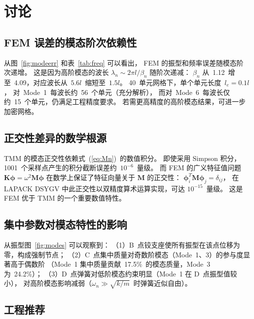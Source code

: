 \documentclass[twoside,12pt]{ctexart}
\newcommand{\betan}{\beta_n}
\begin{document}
\section{讨论}

\subsection{FEM 误差的模态阶次依赖性}

从图~\ref{fig:modeerr} 和表~\ref{tab:freq} 可以看出，
FEM 的振型和频率误差随模态阶次递增。
这是因为高阶模态的波长 $\lambda_n\sim 2\pi l/\betan$ 随阶次递减：
$\betan$ 从~1.12~增至~4.09，对应波长从~$5.6l$~缩短至~$1.5l$。
40~单元网格下，单个单元长度~$l_e=0.1l$，
对~Mode~1~每波长约~56~个单元（充分解析），
而对~Mode~6~每波长仅约~15~个单元，仍满足工程精度要求。
若需更高精度的高阶模态结果，可进一步加密网格。

\subsection{正交性差异的数学根源}

TMM 的模态正交性依赖式~(\ref{eq:Mn})~的数值积分。
即使采用 Simpson 积分，1001~个采样点产生的积分截断误差约~$10^{-6}$~量级。
而 FEM 的广义特征值问题 $\mathbf{K}\bm{\phi}=\omega^2\mathbf{M}\bm{\phi}$
在数学上保证了特征向量关于 $\mathbf{M}$ 的正交性：
$\bm{\phi}_i^T\mathbf{M}\bm{\phi}_j=\delta_{ij}$，
在 LAPACK DSYGV 中此正交性以双精度算术运算实现，可达 $10^{-15}$~量级。
这是 FEM 优于 TMM 的一个重要数值特性。

\subsection{集中参数对模态特性的影响}

从振型图~\ref{fig:modes} 可以观察到：
（1）B~点铰支座使所有振型在该点位移为零，构成强制节点；
（2）C~点集中质量对奇数阶模态（Mode~1、3）的参与度显著高于偶数阶
（Mode~1 集中质量贡献~17.5\%~的模态质量，Mode~3 为~24.2\%）；
（3）D~点弹簧对低阶模态约束明显（Mode~1 在 D~点振型值较小），
对高阶模态影响减弱（$\omega_n\gg\sqrt{k/m}$~时弹簧近似自由）。

\subsection{工程推荐}
\end{document}
